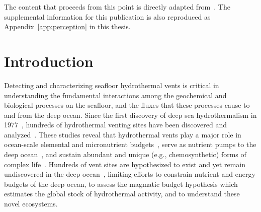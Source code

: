 The content that proceeds from this point is directly adapted from~\cite{preston2022discovering}. The supplemental information for this publication is also reproduced as Appendix~\ref{app:perception} in this thesis.


\section{Introduction}
Detecting and characterizing seafloor hydrothermal vents is critical in understanding the fundamental interactions among the geochemical and biological processes on the seafloor, and the fluxes that these processes cause to and from the deep ocean. Since the first discovery of deep sea hydrothermalism in 1977~\autocite{corliss1979submarine}, hundreds of hydrothermal venting sites have been discovered and analyzed~\autocite{beaulieu2015undiscovered}. These studies reveal that hydrothermal vents play a major role in ocean-scale elemental and micronutrient budgets~\autocite{le2019hydrothermal,resing2015basin}, serve as nutrient pumps to the deep ocean~\autocite{dick2013microbiology, vic2018dispersion, scholz2019shelf, bell2017hydrothermal}, and sustain abundant and unique (e.g., chemosynthetic) forms of complex life~\autocite{grassle1987ecology, georgieva2021history}. Hundreds of vent sites are hypothesized to exist and yet remain undiscovered in the deep ocean~\autocite{beaulieu2015undiscovered}, limiting efforts to constrain nutrient and energy budgets of the deep ocean, to assess the magmatic budget hypothesis which estimates the global stock of hydrothermal activity, and to understand these novel ecosystems.  

